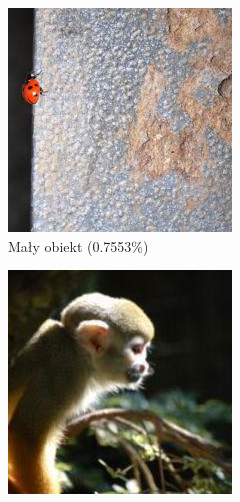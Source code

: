 \begin{figure}[h]
	\centering
	\begin{subfigure}[b]{0.3\textwidth}
		\includegraphics[width=.9\textwidth]{img/examples/size_category_small}
		\caption{Mały obiekt (0.7553\%)}  \label{}
	\end{subfigure}
	\begin{subfigure}[b]{0.3\textwidth}
		\centering\includegraphics[width=.9\textwidth]{img/examples/size_category_medium}

\end{subfigure}
\end{figure}
